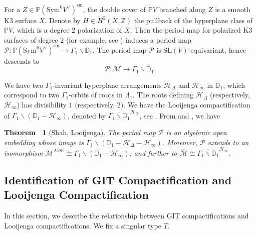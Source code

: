 \documentclass[12pt,reqno,a4paper]{amsart}
\newtheorem{thm}{Theorem~}[section]
\theoremstyle{remark}
\theoremstyle{definition}
\begin{document}
For a $Z\in \mathbb{P}(\mathrm{Sym}^6 V^\vee)^{\mathrm{sm}}$, the double cover of $\mathbb{P} V$ branched along $Z$ is a smooth K3 surface $X$.
Denote by $H\in H^2(X,\mathbb{Z})$ the pullback of the hyperplane class of $\mathbb{P} V$, which is a degree $2$ polarization of $X$.
Then the period map for polarized K3 surfaces of degree $2$ (for example, see \cite[Chapter 6, \S 4.1]{huybrechts2016lectures}) induces a period map $\mathscr{P}\colon \mathbb{P}(\mathrm{Sym}^6 V^\vee)^{\mathrm{sm}}\to \Gamma_1\backslash\mathbb{D}_1$.
The period map $\mathscr{P}$ is $\mathrm{SL}(V)$-equivariant, hence descends to 
\begin{equation*}
    \mathscr{P}\colon \mathcal{M}\to \Gamma_1\backslash\mathbb{D}_1.
\end{equation*}

We have two $\Gamma_1$-invariant hyperplane arrangements $\mathcal{H}_\Delta$ and $\mathcal{H}_\infty$ in $\mathbb{D}_1$, which correspond to two $\Gamma_1$-orbits of roots in $\Lambda_1$.
The roots defining $\mathcal{H}_\Delta$ (respectively, $\mathcal{H}_\infty$) has divisibility $1$ (respectively, $2$).
We have the Looijenga compactification of $\Gamma_1\backslash(\mathbb{D}_1-\mathcal{H}_\infty)$, denoted by $\overline{\Gamma_1\backslash\mathbb{D}_1}^{\mathcal{H}_\infty}$, see \cite{looijenga2003compactificationsII}.
From \cite{shah1980complete} and \cite{looijenga2003compactificationsII}, we have
\begin{thm}[Shah, Looijenga]
\label{thm: Shah--Looijenga}
    The period map $\mathscr{P}$ is an algebraic open embedding whose image is $\Gamma_1\backslash(\mathbb{D}_1-\mathcal{H}_\Delta-\mathcal{H}_\infty)$.
    Moreover, $\mathscr{P}$ extends to an isomorphism $\mathcal{M}^{\mathrm{ADE}}\cong\Gamma_1\backslash(\mathbb{D}_1-\mathcal{H}_\infty)$, and further to $\overline{\mathcal{M}}\cong\overline{\Gamma_1\backslash\mathbb{D}_1}^{\mathcal{H}_\infty}$.
\end{thm}


\subsection{Identification of GIT Compactification and Looijenga Compactification}
\label{subsec: identification of compactifications}

In this section, we describe the relationship between GIT compactifications and Looijenga compactifications.
We fix a singular type $T$.
\end{document}
